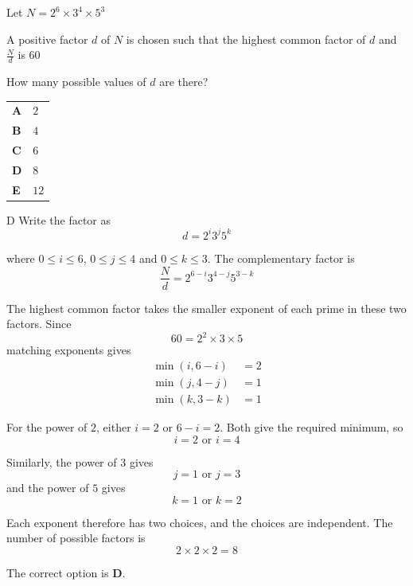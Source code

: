 \documentclass[11pt,a4paper]{article}
\begin{document}
\vspace*{8pt}
\begin{enumerate}[label=\textbf{\arabic*.},leftmargin=*,itemsep=0pt,start=15]
\questionitem[Number]
Let $N=2^6\times3^4\times5^3$

A positive factor $d$ of $N$ is chosen such that the highest common factor of $d$ and $\frac{N}{d}$ is $60$

How many possible values of $d$ are there?

\par\vspace*{12pt}
\begin{tabularx}{\linewidth}{@{}>{\bfseries}l Y@{}}
A &
$2$
\\[0.8em]
B &
$4$
\\[0.8em]
C &
$6$
\\[0.8em]
D &
$8$
\\[0.8em]
E &
$12$
\\
\end{tabularx}

\begin{djsSolution}{D}
Write the factor as
\[
d=2^i3^j5^k
\]

where $0\leq i\leq6$, $0\leq j\leq4$ and $0\leq k\leq3$. The complementary factor is
\[
\frac Nd=2^{6-i}3^{4-j}5^{3-k}
\]

The highest common factor takes the smaller exponent of each prime in these two factors. Since
\[
60=2^2\times3\times5
\]
matching exponents gives
\[
\begin{aligned}
\min(i,6-i)&=2\\[6pt]
\min(j,4-j)&=1\\[6pt]
\min(k,3-k)&=1
\end{aligned}
\]

For the power of $2$, either $i=2$ or $6-i=2$. Both give the required minimum, so
\[
i=2\text{ or }i=4
\]

Similarly, the power of $3$ gives
\[
j=1\text{ or }j=3
\]
and the power of $5$ gives
\[
k=1\text{ or }k=2
\]

Each exponent therefore has two choices, and the choices are independent. The number of possible factors is
\[
2\times2\times2=8
\]

The correct option is \textbf{D}.
\end{djsSolution}
\end{enumerate}
\end{document}
